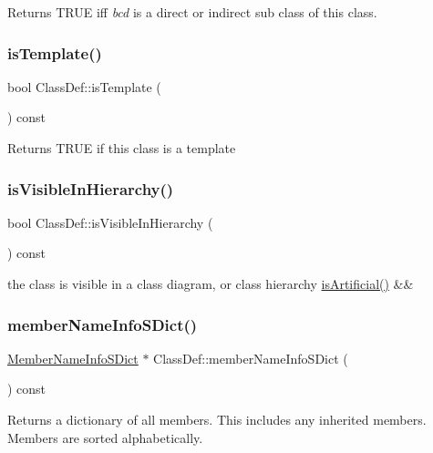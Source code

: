 Returns T\+R\+UE iff {\itshape bcd} is a direct or indirect sub class of this class. \mbox{\label{class_class_def_a7337a3eb903b689ac256169c6ee34e7b}} 
\subsubsection{\texorpdfstring{isTemplate()}{isTemplate()}}
{\footnotesize\ttfamily bool Class\+Def\+::is\+Template (\begin{DoxyParamCaption}{ }\end{DoxyParamCaption}) const}

Returns T\+R\+UE if this class is a template \mbox{\label{class_class_def_ad529a3402d450f318ed610833c9bb0d2}} 
\subsubsection{\texorpdfstring{isVisibleInHierarchy()}{isVisibleInHierarchy()}}
{\footnotesize\ttfamily bool Class\+Def\+::is\+Visible\+In\+Hierarchy (\begin{DoxyParamCaption}{ }\end{DoxyParamCaption}) const}

the class is visible in a class diagram, or class hierarchy \mbox{\hyperlink{class_definition_a24d80ca0884834c9e767482af37b7248}{is\+Artificial()}} \&\&\mbox{\label{class_class_def_a63a304d56ef1f0c11097069619c0a273}} 
\subsubsection{\texorpdfstring{memberNameInfoSDict()}{memberNameInfoSDict()}}
{\footnotesize\ttfamily \mbox{\hyperlink{class_member_name_info_s_dict}{Member\+Name\+Info\+S\+Dict}} $\ast$ Class\+Def\+::member\+Name\+Info\+S\+Dict (\begin{DoxyParamCaption}{ }\end{DoxyParamCaption}) const}

Returns a dictionary of all members. This includes any inherited members. Members are sorted alphabetically. \mbox{\label{class_class_def_a67f89df2361269ef583f33b2ee087a2b}} 
